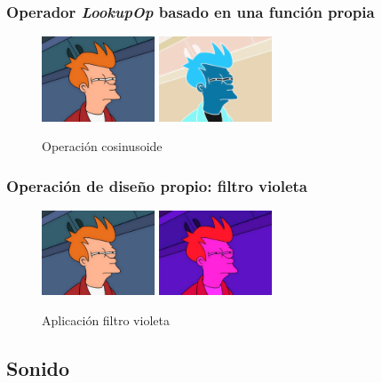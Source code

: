 \subsubsection{Operador \textit{LookupOp} basado en una función propia}
\begin{figure}[H]
 \centering
  \includegraphics[width=0.3\textwidth]{imagenes/Fry.jpg}
  \includegraphics[width=0.3\textwidth]{imagenes/fryCos.jpg}
 \caption{Operación cosinusoide}
 \label{diseño}
 \end{figure}
\subsubsection{Operación de diseño propio: filtro violeta}
\vskip0.3cm
\begin{figure}[H]
 \centering
  \includegraphics[width=0.3\textwidth]{imagenes/Fry.jpg}
  \includegraphics[width=0.3\textwidth]{imagenes/fryVioleta.jpg}
 \caption{Aplicación filtro violeta}
 \label{diseño}
 \end{figure}
\subsection{Sonido}
